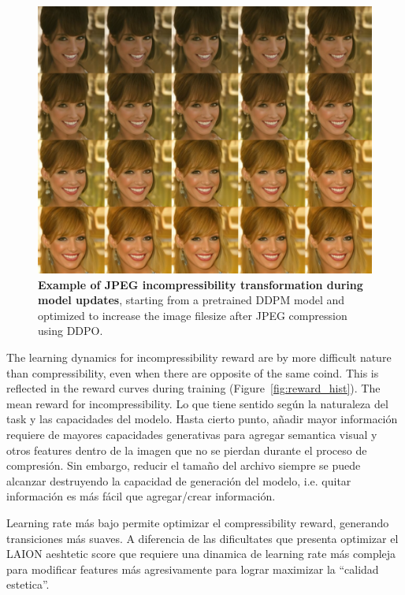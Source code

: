 \begin{figure}[ht]
  \centering
  \includegraphics[scale=1.40]{img/results/incompressibility_26.png}
  \vspace{-0pt}  %
    \captionsetup{width=\textwidth} %
    \caption{\textbf{Example of JPEG incompressibility transformation during model updates}, starting from a pretrained DDPM model and optimized to increase the image filesize after JPEG compression using DDPO.}
    \label{fig:ddpm-to-ddpo-incompressibility}
\end{figure}

\noindent The learning dynamics for incompressibility reward are by more
difficult nature than compressibility, even when there are opposite of the
same coind. This is reflected in the reward curves during training (Figure~\ref{fig:reward_hist}). The mean reward for incompressibility. Lo que tiene sentido según la naturaleza del task y las capacidades del modelo. Hasta cierto punto, añadir mayor información  requiere de mayores capacidades generativas para agregar semantica visual y  otros features dentro de la imagen que no se pierdan durante el proceso de compresión. Sin embargo, reducir el tamaño del archivo siempre se puede alcanzar destruyendo la capacidad de generación del modelo, i.e. quitar información es más fácil que agregar/crear información.

\noindent Learning rate más bajo permite optimizar el compressibility reward, generando transiciones más suaves. A diferencia de las dificultates que presenta optimizar el LAION aeshtetic score que requiere una dinamica de learning rate más compleja para modificar features más agresivamente para lograr maximizar la ``calidad estetica''. \\

